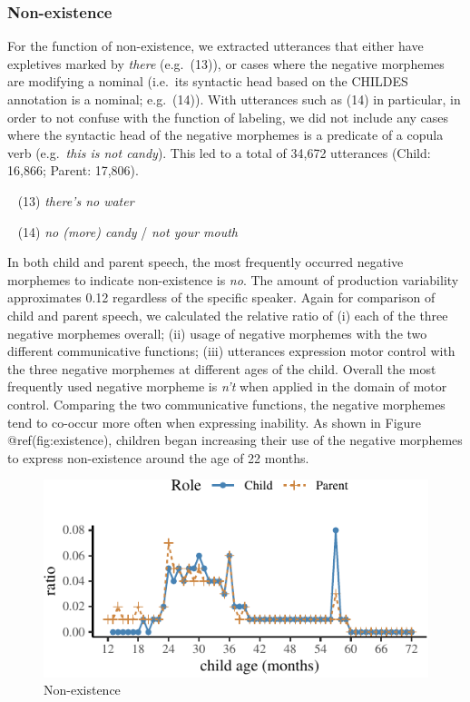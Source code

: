 \documentclass[10pt, letterpaper]{article}
\newenvironment{CodeChunk}{}{}
\begin{document}
\hypertarget{non-existence}{%
\subsubsection{Non-existence}\label{non-existence}}

For the function of non-existence, we extracted utterances that either
have expletives marked by \emph{there} (e.g.~(13)), or cases where the
negative morphemes are modifying a nominal (i.e.~its syntactic head
based on the CHILDES annotation is a nominal; e.g.~(14)). With
utterances such as (14) in particular, in order to not confuse with the
function of labeling, we did not include any cases where the syntactic
head of the negative morphemes is a predicate of a copula verb
(e.g.~\emph{this is not candy}). This led to a total of 34,672
utterances (Child: 16,866; Parent: 17,806).

~ (13) \emph{there's no water}

~ (14) \emph{no (more) candy} / \emph{not your mouth}

In both child and parent speech, the most frequently occurred negative
morphemes to indicate non-existence is \emph{no}. The amount of
production variability approximates 0.12 regardless of the specific
speaker. Again for comparison of child and parent speech, we calculated
the relative ratio of (i) each of the three negative morphemes overall;
(ii) usage of negative morphemes with the two different communicative
functions; (iii) utterances expression motor control with the three
negative morphemes at different ages of the child. Overall the most
frequently used negative morpheme is \emph{n't} when applied in the
domain of motor control. Comparing the two communicative functions, the
negative morphemes tend to co-occur more often when expressing
inability. As shown in Figure @ref(fig:existence), children began
increasing their use of the negative morphemes to express non-existence
around the age of 22 months.

\begin{CodeChunk}
\begin{figure}[H]

{\centering \includegraphics{figs/existence-1} 

}

\caption[Non-existence]{Non-existence}\label{fig:existence}
\end{figure}
\end{CodeChunk}
\end{document}
